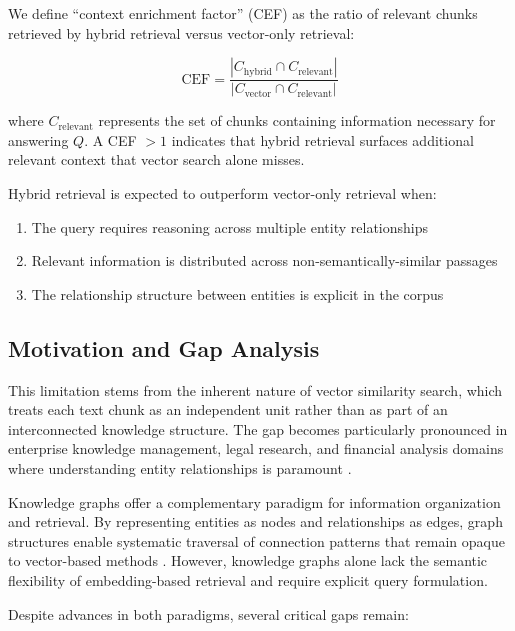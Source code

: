\documentclass[conference]{IEEEtran}
\begin{document}
We define ``context enrichment factor'' (CEF) as the ratio of relevant chunks retrieved by hybrid retrieval versus vector-only retrieval:

\begin{equation}
    \text{CEF} = \frac{|C_{\text{hybrid}} \cap C_{\text{relevant}}|}{|C_{\text{vector}} \cap C_{\text{relevant}}|}
\end{equation}

where $C_{\text{relevant}}$ represents the set of chunks containing information necessary for answering $Q$. A CEF $> 1$ indicates that hybrid retrieval surfaces additional relevant context that vector search alone misses.

Hybrid retrieval is expected to outperform vector-only retrieval when:
\begin{enumerate}
    \item[(a)] The query requires reasoning across multiple entity relationships
    \item[(b)] Relevant information is distributed across non-semantically-similar passages
    \item[(c)] The relationship structure between entities is explicit in the corpus
\end{enumerate}

\subsection{Motivation and Gap Analysis}

This limitation stems from the inherent nature of vector similarity search, which treats each text chunk as an independent unit rather than as part of an interconnected knowledge structure. The gap becomes particularly pronounced in enterprise knowledge management, legal research, and financial analysis domains where understanding entity relationships is paramount \cite{pan2024large}.

Knowledge graphs offer a complementary paradigm for information organization and retrieval. By representing entities as nodes and relationships as edges, graph structures enable systematic traversal of connection patterns that remain opaque to vector-based methods \cite{hogan2021knowledge}. However, knowledge graphs alone lack the semantic flexibility of embedding-based retrieval and require explicit query formulation.

Despite advances in both paradigms, several critical gaps remain:
\end{document}
